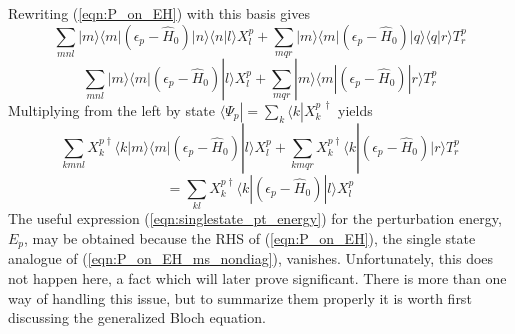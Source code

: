 \noindent Rewriting (\ref{eqn:P_on_EH}) with this basis gives
\begin{equation*}
\sum_{mnl}|m\rangle \langle m | (\epsilon_{p} - \hat{H}_{0})|n\rangle \langle n | l \rangle X_{l}^{p}
+ \sum_{mqr}|m\rangle \langle m | (\epsilon_{p} - \hat{H}_{0})|q\rangle \langle q | r \rangle T_{r}^{p}
\end{equation*}
\begin{equation*}
\sum_{mnl}|m\rangle \langle m | (\epsilon_{p} - \hat{H}_{0})   | l \rangle X_{l}^{p}
+ \sum_{mqr}|m\rangle \langle m | (\epsilon_{p} - \hat{H}_{0}) | r \rangle T_{r}^{p}
\label{eqn:P_on_EH_explicit_bas}
\end{equation*}
Multiplying from the left by state $\langle\Psi_{p}| = \sum_{k}\langle k | X_{k}^{p \ \dagger}$ yields
\begin{equation*}
\sum_{kmnl}X^{p\dagger}_{k}\langle k | m\rangle \langle m | (\epsilon_{p} - \hat{H}_{0})   | l \rangle X_{l}^{p}
+ \sum_{kmqr}X^{p\dagger}_{k}\langle k | (\epsilon_{p} - \hat{H}_{0}) | r \rangle T_{r}^{p}
\end{equation*}
\begin{equation}
=  \sum_{kl}X^{p\dagger}_{k}\langle k | (\epsilon_{p} - \hat{H}_{0}) | l \rangle X_{l}^{p}
\label{eqn:P_on_EH_ms_nondiag}
\end{equation}
The useful expression (\ref{eqn:singlestate_pt_energy}) for the perturbation energy, $E_{p}$, 
may be obtained because the RHS of (\ref{eqn:P_on_EH}), the single state analogue of (\ref{eqn:P_on_EH_ms_nondiag}), vanishes.
Unfortunately, this does not happen here, a fact which will later prove significant.
There is more than one way of handling this issue, but to summarize them properly it is
worth first discussing the generalized Bloch equation.

